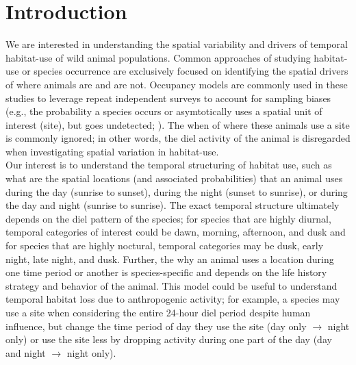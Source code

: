 \documentclass[12pt]{article}
\begin{document}
\maketitle


\section{Introduction}
We are interested in understanding the spatial variability and drivers of temporal habitat-use of wild animal populations. Common approaches of studying habitat-use or species occurrence are exclusively focused on identifying the spatial drivers of where animals are and are not. Occupancy models are commonly used in these studies to leverage repeat independent surveys to account for sampling biases (e.g., the probability a species occurs or asymtotically uses a spatial unit of interest (site), but goes undetected; \citealt{occupancybook}). The when of where these animals use a site is commonly ignored; in other words, the diel activity of the animal is disregarded when investigating spatial variation in habitat-use. \\

Our interest is to understand the temporal structuring of habitat use, such as what are the spatial locations (and associated probabilities) that an animal uses during the day (sunrise to sunset), during the night (sunset to sunrise), or during the day and night (sunrise to sunrise). The exact temporal structure ultimately depends on the diel pattern of the species; for species that are highly diurnal, temporal categories of interest could be dawn, morning, afternoon, and dusk and for species that are highly noctural, temporal categories may be dusk, early night, late night, and dusk. Further, the why an animal uses a location during one time period or another is species-specific and depends on the life history strategy and behavior of the animal. This model could be useful to understand temporal habitat loss due to anthropogenic activity; for example, a species may use a site when considering the entire 24-hour diel period despite human influence, but change the time period of day they use the site (day only $\rightarrow$ night only) or use the site less by dropping activity during one part of the day (day and night $\rightarrow$ night only). \\
\end{document}
